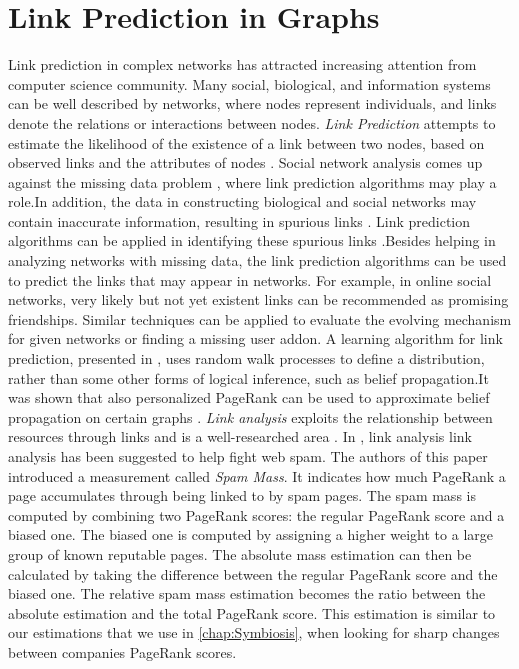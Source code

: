 \documentclass[11pt,oneside]{book}
\let\Oldsection\section
\renewcommand{\section}{\FloatBarrier\Oldsection}
\begin{document}
\section{Link Prediction in Graphs}
\label{sec:link_prediction}
Link prediction in complex networks has attracted increasing attention from computer science community. Many social, biological, and information systems can be well described by
networks, where nodes represent individuals, and links denote the relations or interactions between nodes. \textit{Link Prediction} attempts to estimate the likelihood of the existence of a link between two nodes, based on observed links and the attributes of nodes \citep{getoor2005link}.
Social network analysis comes up against the missing data problem \citep{kossinets2006effects}, where link prediction algorithms may play a role.In addition, the data in constructing biological and social networks may contain inaccurate information, resulting in spurious links \citep{von2002comparative, butts2003network}. Link prediction algorithms can be applied in identifying these spurious links \citep{guimera2009missing}.Besides helping in analyzing networks with missing data, the link prediction algorithms can be used to predict the links that may appear in networks. For example, in online social networks, very likely but not yet existent links can be recommended as promising friendships. Similar techniques can be applied to evaluate the evolving mechanism for given networks or finding a missing user addon.
A learning algorithm for link prediction, presented in \citep{lao2010relational}, uses random walk processes to define a distribution, rather than some other forms of logical inference, such as belief propagation.It was shown that also personalized PageRank can be used to approximate belief propagation on certain graphs \citep{cohen2010graph}. \textit{Link analysis} exploits the relationship between resources through links and is a well-researched area \citep{henzinger2000link}. In \citep{gyongyi2006link}, link analysis link analysis has been suggested to help fight web spam. The authors of this paper introduced a measurement called \textit{Spam Mass}. It indicates how much PageRank a page accumulates through being linked to by spam pages. The spam mass is computed  by combining two PageRank scores: the regular PageRank score and a biased one. The biased one is computed by assigning a higher weight to a large group of known reputable pages. The absolute mass estimation can then be calculated by taking the difference between the regular PageRank score and the biased one. The relative spam mass estimation becomes the ratio between the absolute estimation and the total PageRank score. This estimation is similar to our estimations that we use in \autoref{chap:Symbiosis}, when looking for sharp changes between companies PageRank scores.
\end{document}
